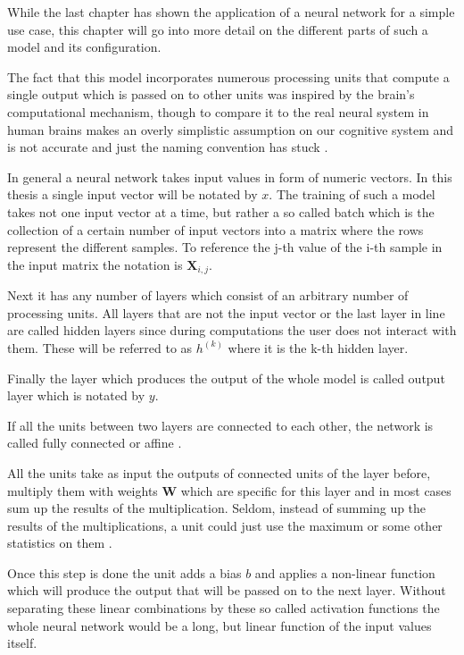 While the last chapter has shown the application of a neural network for a simple use case, 
this chapter will go into more detail on the different parts of such a model and its configuration.

The fact that this model incorporates numerous processing units that compute a single output which is passed on to other units was inspired by the brain's computational mechanism, 
though to compare it to the real neural system in human brains makes an overly simplistic assumption on our cognitive system and is not accurate and just the naming convention has stuck \citep{goldberg2017neural}.

In general a neural network takes input values in form of numeric vectors.
In this thesis a single input vector will be notated by $x$. 
The training of such a model takes not one input vector at a time, but rather a so called batch which is the collection of a certain number of input vectors into a matrix where the rows represent the different samples. 
To reference the j-th value of the i-th sample in the input matrix the notation is $\textbf{X}_{i,j}$.

Next it has any number of layers which consist of an arbitrary number of processing units. 
All layers that are not the input vector or the last layer in line are called hidden layers since during computations the user does not interact with them. 
These will be referred to as $h^{(k)}$ where it is the k-th hidden layer.

Finally the layer which produces the output of the whole model is called output layer which is notated by $y$. 

If all the units between two layers are connected to each other, the network is called fully connected or affine \citep{goldberg2017neural}.

All the units take as input the outputs of connected units of the layer before, multiply them with weights $\textbf{W}$ which are specific for this layer and in most cases sum up the results of the multiplication. 
Seldom, instead of summing up the results of the multiplications, a unit could just use the maximum or some other statistics on them \citep{goldberg2017neural}.

Once this step is done the unit adds a bias $b$ and applies a non-linear function which will produce the output that will be passed on to the next layer. 
Without separating these linear combinations by these so called activation functions the whole neural network would be a long, but linear function of the input values itself. 

